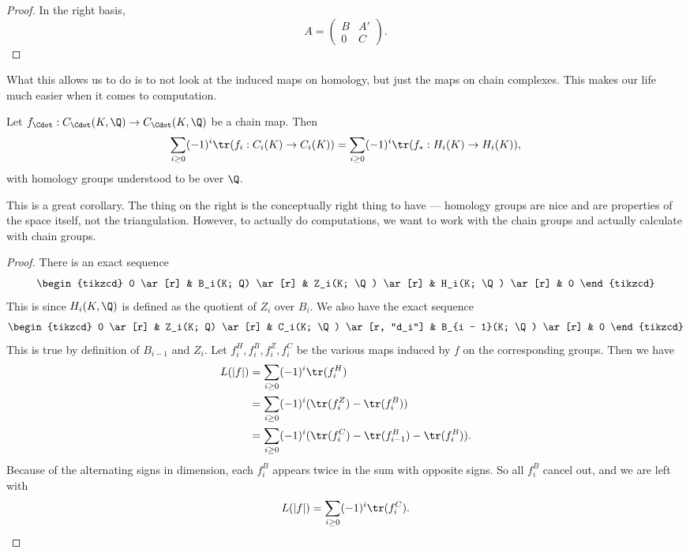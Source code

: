 \documentclass[a4paper]{article}
\begin{document}
\begin{proof}
  In the right basis,
  \[
    A =
    \begin{pmatrix}
      B & A'\\
      0 & C
    \end{pmatrix}.
  \]
\end{proof}

What this allows us to do is to not look at the induced maps on homology, but just the maps on chain complexes. This makes our life much easier when it comes to computation.

\begin{cor}
  Let $f_{\Cdot}: C_{\Cdot}(K, \Q) \to C_{\Cdot}(K, \Q)$ be a chain map. Then
  \[
    \sum_{i \geq 0} (-1)^i \tr(f_i: C_i(K) \to C_i(K)) = \sum_{i \geq 0} (-1)^i \tr(f_*: H_i(K) \to H_i(K)),
  \]
  with homology groups understood to be over $\Q$.
\end{cor}
This is a great corollary. The thing on the right is the conceptually right thing to have --- homology groups are nice and are properties of the space itself, not the triangulation. However, to actually do computations, we want to work with the chain groups and actually calculate with chain groups.

\begin{proof}
  There is an exact sequence
  \[
    \begin{tikzcd}
      0 \ar[r] & B_i(K; Q) \ar[r] & Z_i(K; \Q) \ar[r] & H_i(K; \Q) \ar[r] & 0
    \end{tikzcd}
  \]
  This is since $H_i(K, \Q)$ is defined as the quotient of $Z_i$ over $B_i$. We also have the exact sequence
  \[
    \begin{tikzcd}
      0 \ar[r] & Z_i(K; Q) \ar[r] & C_i(K; \Q) \ar[r, "d_i"] & B_{i - 1}(K; \Q) \ar[r] & 0
    \end{tikzcd}
  \]
  This is true by definition of $B_{i - 1}$ and $Z_i$. Let $f_i^H, f_i^B, f_i^Z, f_i^C$ be the various maps induced by $f$ on the corresponding groups. Then we have
  \begin{align*}
    L(|f|) &= \sum_{i \geq 0} (-1)^i \tr(f_i^H)\\
    &= \sum_{i \geq 0} (-1)^i (\tr(f_i^Z) - \tr(f_i^B))\\
    &= \sum_{i \geq 0} (-1)^i (\tr(f_i^C) - \tr(f_{i - 1}^B) - \tr(f_i^B)).
  \end{align*}
  Because of the alternating signs in dimension, each $f_i^B$ appears twice in the sum with opposite signs. So all $f_i^B$ cancel out, and we are left with
  \[
    L(|f|) = \sum_{i \geq 0} (-1)^i \tr (f_i^C).
  \]
\end{proof}
\end{document}
